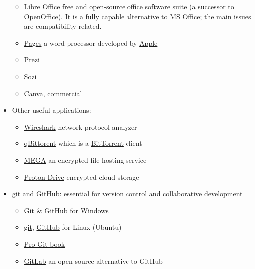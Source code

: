 \documentclass{article}
\begin{document}
\begin{itemize}
\begin{itemize}
            \item \href{https://www.libreoffice.org/}{Libre Office} free and open-source office software suite (a successor to OpenOffice). It is a fully capable alternative to MS Office; the main issues are compatibility-related.
            
            \item \href{https://www.apple.com/pages/}{Pages} a word processor developed by \href{https://en.wikipedia.org/wiki/Apple_Inc.}{Apple}
            
            \item \href{https://prezi.com/}{Prezi}
            
            \item \href{https://sozi.baierouge.fr/}{Sozi}

            \item \href{https://www.canva.com/}{Canva}, commercial
        \end{itemize}
    
    \item Other useful applications:
    \begin{itemize}
        \item \href{https://www.wireshark.org/}{Wireshark} network protocol analyzer
        \item \href{https://en.wikipedia.org/wiki/QBittorrent}{qBittorent} which is a \href{https://en.wikipedia.org/wiki/BitTorrent}{BitTorrent} client
        \item \href{https://en.wikipedia.org/wiki/Mega_(service)}{MEGA} an encrypted file hosting service
        \item \href{https://proton.me/drive}{Proton Drive} encrypted cloud storage
    \end{itemize}
    
    \item \href{https://git-scm.com/}{git} and \href{https://github.com/}{GitHub}: essential for version control and collaborative development
    \begin{itemize}
        \item \href{https://www.youtube.com/watch?v=SWYqp7iY_Tc}{Git \& GitHub} for Windows
        \item \href{https://www.youtube.com/watch?v=USjZcfj8yxE}{git}, \href{https://www.youtube.com/watch?v=nhNq2kIvi9s}{GitHub} for Linux (Ubuntu)
        \item \href{https://git-scm.com/book/en/v2}{Pro Git book}
        \item \href{https://about.gitlab.com/}{GitLab} an open source alternative to GitHub
    \end{itemize}
    

\end{itemize}
\end{document}
